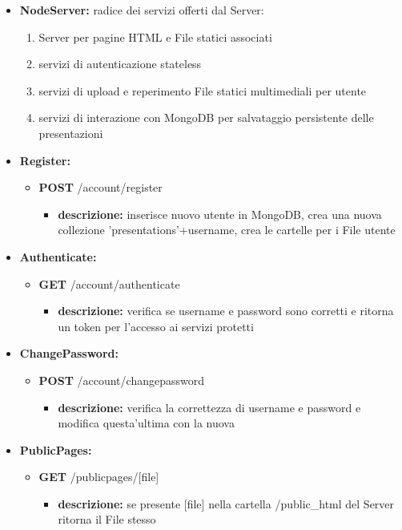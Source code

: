 {{\begin{itemize}
		\item \textbf{NodeServer:} radice dei servizi offerti dal Server:
			\begin{enumerate}
				\item Server per pagine HTML e File statici associati
				\item servizi di autenticazione stateless
				\item servizi di upload e reperimento File statici multimediali per utente
				\item servizi di interazione con MongoDB per salvataggio persistente delle presentazioni
			\end{enumerate}	
				
		\item \textbf{Register:}
			\begin{itemize}
			\item  \textbf{POST} /account/register 
				\begin{itemize} 
				\item \textbf{descrizione:} inserisce nuovo utente in MongoDB, crea una nuova collezione 'presentations'+username, crea le cartelle per i File utente
				\end{itemize}
			\end{itemize}
			
		\item \textbf{Authenticate:}
			\begin{itemize}
			\item  \textbf{GET} /account/authenticate 
				\begin{itemize} 
				\item \textbf{descrizione:} verifica se username e password sono corretti e ritorna un token per l'accesso ai servizi protetti
				\end{itemize}
			\end{itemize}
				
		\item \textbf{ChangePassword:}
			\begin{itemize}
			\item  \textbf{POST} /account/changepassword 
				\begin{itemize} 
				\item \textbf{descrizione:} verifica la correttezza di username e password e modifica questa'ultima con la nuova 
				\end{itemize}
			\end{itemize}
			
		\item \textbf{PublicPages:}
			\begin{itemize}
			\item  \textbf{GET} /publicpages/[file] 
				\begin{itemize} 
				\item \textbf{descrizione:} se presente [file] nella cartella /public\_html del Server\ped{g} ritorna il File stesso 
				\end{itemize}
			\end{itemize}
			

\end{itemize}}}
